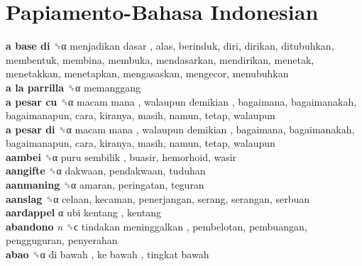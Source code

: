 \twocolumn
\chapter{Papiamento-Bahasa Indonesian}
\small
{}\textbf{a base di} ␝α   menjadikan dasar , alas, berinduk, diri, dirikan, ditubuhkan, membentuk, membina, membuka, mendasarkan, mendirikan, menetak, menetakkan, menetapkan, mengasaskan, mengecor, menubuhkan  \\
\textbf{a la parrilla} ␝α  memanggang  \\
\textbf{a pesar cu} ␝α   macam mana ,  walaupun demikian , bagaimana, bagaimanakah, bagaimanapun, cara, kiranya, masih, namun, tetap, walaupun  \\
\textbf{a pesar di} ␝α   macam mana ,  walaupun demikian , bagaimana, bagaimanakah, bagaimanapun, cara, kiranya, masih, namun, tetap, walaupun  \\
\textbf{aambei} ␝α   puru sembilik , buasir, hemorhoid, wasir  \\
\textbf{aangifte} ␝α  dakwaan, pendakwaan, tuduhan  \\
\textbf{aanmaning} ␝α  amaran, peringatan, teguran  \\
\textbf{aanslag} ␝α  celaan, kecaman, penerjangan, serang, serangan, serbuan  \\
\textbf{aardappel} α   ubi kentang , kentang  \\
\textbf{abandono} \emph{n}  ␝ϲ   tindakan meninggalkan , pembelotan, pembuangan, pengguguran, penyerahan  \\
\textbf{abao} ␝α   di bawah ,  ke bawah ,  tingkat bawah   \\
